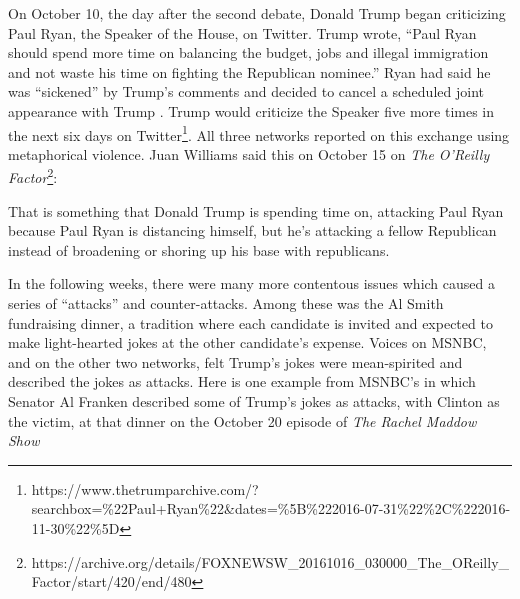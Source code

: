 


On October 10, the day after the second debate, Donald Trump began criticizing Paul 
Ryan, the Speaker of the House, on Twitter. Trump 
wrote, ``Paul Ryan should spend more time on balancing the budget, jobs and 
illegal immigration and not waste his time on fighting the Republican nominee.''
Ryan had said he was ``sickened'' by Trump's comments and decided to cancel a
scheduled joint appearance with Trump \cite{Fahrentold2016}.
Trump would criticize the Speaker five more times in
the next six days on Twitter\footnote{\tiny https://www.thetrumparchive.com/?searchbox=\%22Paul+Ryan\%22\&dates=\%5B\%222016-07-31\%22\%2C\%222016-11-30\%22\%5D}.
All three networks reported on this exchange using metaphorical
violence. Juan Williams said this on October 15 on \emph{The O'Reilly Factor}\footnote{\tiny https://archive.org/details/FOXNEWSW\_20161016\_030000\_The\_OReilly\_Factor/start/420/end/480}:

\begin{exe}
  \ex That is something that Donald Trump is spending time on, attacking Paul
  Ryan because Paul Ryan is distancing himself, but he's attacking a fellow
  Republican instead of broadening or shoring up his base with republicans.
\end{exe}

In the following weeks, there were many more contentous issues which caused a
series of ``attacks'' and counter-attacks. Among these was the Al Smith 
fundraising dinner, a tradition where each candidate is invited and expected
to make light-hearted jokes at the other candidate's expense. 
Voices on MSNBC, and on the other two networks, felt
Trump's jokes were mean-spirited and described the jokes as attacks.
Here is one example from MSNBC's in which 
Senator Al Franken described some of Trump's jokes as attacks, 
with Clinton as the victim, at that dinner on the October 20 episode of
\emph{The Rachel Maddow Show}

